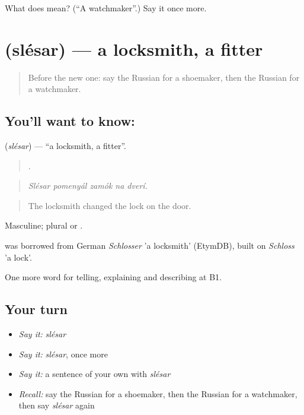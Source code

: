 \begin{tcolorbox}[breakable,colback=teal!4,colframe=teal!35!black,title={Before you move on}]
What does  mean? (\textquotedblleft{}A watchmaker\textquotedblright{}.) Say it once more.
\end{tcolorbox}
\section[\texorpdfstring{\ru{слесарь} (slésar)}{слесарь (slésar)}]{ (slésar) — a locksmith, a fitter}

\label{lesson:RU-C447-slesar}



\begin{quote}
Before the new one: say the Russian for a shoemaker, then the Russian for a watchmaker.
\end{quote}

\subsection*{You'll want to know: }
\textbf{} (\emph{slésar}) — \textquotedblleft{}a locksmith, a fitter\textquotedblright{}.

\begin{quote}
    .
\end{quote}

\begin{quote}
\emph{Slésar pomenyál zamók na dverí.}
\end{quote}

\begin{quote}
The locksmith changed the lock on the door.
\end{quote}

Masculine; plural \emph{} or \emph{}.

\begin{cousinweb}
\emph{} was borrowed from German \emph{Schlosser} 'a locksmith' (EtymDB), built on \emph{Schloss} 'a lock'.
\end{cousinweb}

\begin{grammarlens}[title={What you've built}]
One more word for telling, explaining and describing at B1.
\end{grammarlens}

\subsection*{Your turn}
\begin{itemize}
\raggedright
  \item \emph{Say it:} \emph{slésar}
  \item \emph{Say it:} \emph{slésar}, once more
  \item \emph{Say it:} a sentence of your own with \emph{slésar}
  \item \emph{Recall:} say the Russian for a shoemaker, then the Russian for a watchmaker, then say \emph{slésar} again
\end{itemize}

